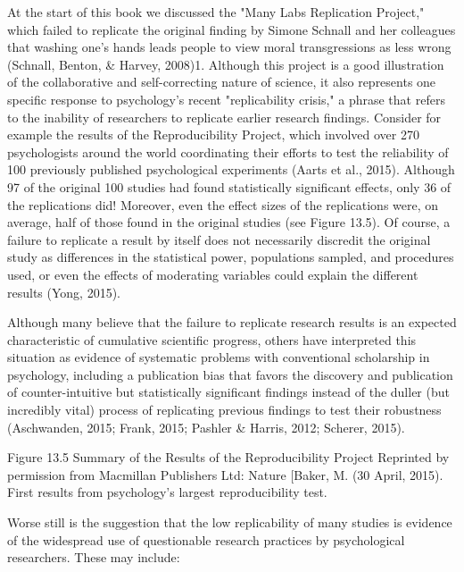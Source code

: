 At the start of this book we discussed the "Many Labs Replication Project," which failed to replicate the original finding by Simone Schnall and her colleagues that washing one's hands leads people to view moral transgressions as less wrong (Schnall, Benton, \& Harvey, 2008)1. Although this project is a good illustration of the collaborative and self-correcting nature of science, it also represents one specific response to psychology's recent "replicability crisis," a phrase that refers to the inability of researchers to replicate earlier research findings. Consider for example the results of the Reproducibility Project, which involved over 270 psychologists around the world coordinating their efforts to test the reliability of 100 previously published psychological experiments (Aarts et al., 2015). Although 97 of the original 100 studies had found statistically significant effects, only 36 of the replications did! Moreover, even the effect sizes of the replications were, on average, half of those found in the original studies (see Figure 13.5). Of course, a failure to replicate a result by itself does not necessarily discredit the original study as differences in the statistical power, populations sampled, and procedures used, or even the effects of moderating variables could explain the different results (Yong, 2015).


Although many believe that the failure to replicate research results is an expected characteristic of cumulative scientific progress, others have interpreted this situation as evidence of systematic problems with conventional scholarship in psychology, including a publication bias that favors the discovery and publication of counter-intuitive but statistically significant findings instead of the duller (but incredibly vital) process of replicating previous findings to test their robustness (Aschwanden, 2015; Frank, 2015; Pashler \& Harris, 2012; Scherer, 2015).

Figure 13.5 Summary of the Results of the Reproducibility Project Reprinted by permission from Macmillan Publishers Ltd: Nature [Baker, M. (30 April, 2015). First results from psychology's largest reproducibility test.

Worse still is the suggestion that the low replicability of many studies is evidence of the widespread use of questionable research practices by psychological researchers. These may include:


